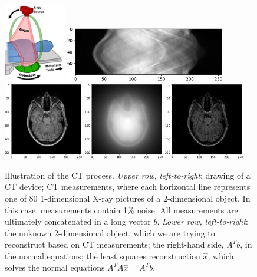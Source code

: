 \documentclass[10pt,a4paper]{article}
\theoremstyle{plain}
\theoremstyle{definition}
\begin{document}
\begin{figure}[htb]
  \centering
  \includegraphics[width=0.24\textwidth]{assets/CT_drawing.png}
  \includegraphics[width=0.62\textwidth]{assets/im_sinogram.png}\\
  \includegraphics[width=0.31\textwidth]{assets/im_original.png}
  \includegraphics[width=0.31\textwidth]{assets/im_Radj.png}
  \includegraphics[width=0.31\textwidth]{assets/im_reconstr_nofilter.png}
  \caption{Illustration of the CT process.
  \emph{Upper row, left-to-right}: drawing of a CT device;
  CT measurements, where each horizontal line represents one of 80 1-dimensional X-ray pictures of a 2-dimensional object.  In this case, measurements contain 1\% noise.
  All measurements are ultimately concatenated in a long vector \(b\).
  \emph{Lower row, left-to-right}: the unknown 2-dimensional object, which we are trying to reconstruct based on CT measurements;
  the right-hand side, \(A^T b\), in the normal equations;
  the least squares reconstruction \(\hat{x}\), which solves the normal
  equations \(A^T A \hat{x} = A^T b\).}
  \label{CT}
\end{figure}
\end{document}
